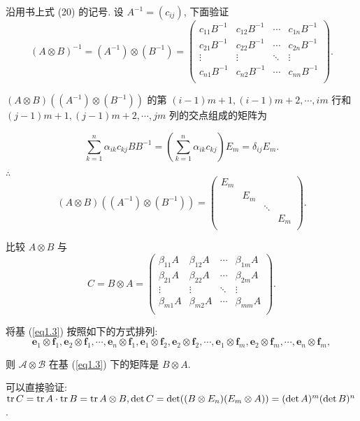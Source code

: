 \documentclass{ctexart}
\begin{document}
\begin{solution}
    沿用书上式 (20) 的记号. 设 $A^{-1}=(c_{ij})$, 下面验证
    \[(A\otimes B)^{-1}=(A^{-1})\otimes(B^{-1})=\begin{pmatrix}
        c_{11}B^{-1} & c_{12}B^{-1} & \cdots & c_{1n}B^{-1} \\
        c_{21}B^{-1} & c_{22}B^{-1} & \cdots & c_{2n}B^{-1} \\
        \vdots & \vdots & \ddots & \vdots \\
        c_{n1}B^{-1} & c_{n2}B^{-1} & \cdots & c_{nn}B^{-1} \\
    \end{pmatrix}.\]

    $(A\otimes B)((A^{-1})\otimes(B^{-1}))$ 的第 $(i-1)m+1,(i-1)m+2,\cdots,im$ 行和 $(j-1)m+1,(j-1)m+2,\cdots,jm$ 列的交点组成的矩阵为

    \[\sum\limits_{k=1}^n\alpha_{ik}c_{kj}BB^{-1}=\left(\sum\limits_{k=1}^n\alpha_{ik}c_{kj}\right)E_m=\delta_{ij}E_m.\]

    $\therefore$
    \[(A\otimes B)((A^{-1})\otimes(B^{-1}))=\begin{pmatrix}
        E_m \\
        & E_m \\
        && \ddots \\
        &&& E_m \\
    \end{pmatrix}.\]
\end{solution}
\begin{exercise}%
    比较 $A\otimes B$ 与
    \[C=B\otimes A=\begin{pmatrix}
        \beta_{11}A & \beta_{12}A & \cdots & \beta_{1m}A \\
        \beta_{21}A & \beta_{22}A & \cdots & \beta_{2m}A \\
        \vdots & \vdots & \ddots & \vdots \\
        \beta_{m1}A & \beta_{m2}A & \cdots & \beta_{mm}A \\
    \end{pmatrix}.\]
\end{exercise}
\begin{solution}
    将基 (\ref{eq1.3}) 按照如下的方式排列:
    \[\boldsymbol{e}_1\otimes\boldsymbol{f}_1,\boldsymbol{e}_2\otimes\boldsymbol{f}_1,\cdots,\boldsymbol{e}_n\otimes\boldsymbol{f}_1,\boldsymbol{e}_1\otimes\boldsymbol{f}_2,\boldsymbol{e}_2\otimes\boldsymbol{f}_2,\cdots,\boldsymbol{e}_1\otimes\boldsymbol{f}_m,\boldsymbol{e}_2\otimes\boldsymbol{f}_m,\cdots,\boldsymbol{e}_n\otimes\boldsymbol{f}_m,\]

    则
    $\mathcal{A}\otimes\mathcal{B}$ 在基 (\ref{eq1.3}) 下的矩阵是 $B\otimes A$.

    可以直接验证: $\operatorname{tr} C=\operatorname{tr} A\cdot\operatorname{tr} B=\operatorname{tr} A\otimes B,\det C=\det((B\otimes E_n)(E_m\otimes A))=(\det A)^m(\det B)^n$.
\end{solution}
\end{document}
